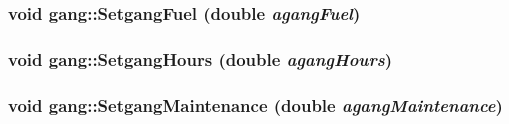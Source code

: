 \label{classgang_aca944833959e462beb2801d5b273a7b9}
\hypertarget{classgang_a698911d3a759dda027bb1d4bcce89efb}{
\subsubsection[{SetgangFuel}]{\setlength{\rightskip}{0pt plus 5cm}void gang::SetgangFuel (double {\em agangFuel})}}
\label{classgang_a698911d3a759dda027bb1d4bcce89efb}
\hypertarget{classgang_a40c3667685b17ddae65b055982ab3b27}{
\subsubsection[{SetgangHours}]{\setlength{\rightskip}{0pt plus 5cm}void gang::SetgangHours (double {\em agangHours})}}
\label{classgang_a40c3667685b17ddae65b055982ab3b27}
\hypertarget{classgang_a60d3a0bae152f5da29c7d71f4be9d568}{
\subsubsection[{SetgangMaintenance}]{\setlength{\rightskip}{0pt plus 5cm}void gang::SetgangMaintenance (double {\em agangMaintenance})}}
\label{classgang_a60d3a0bae152f5da29c7d71f4be9d568}


